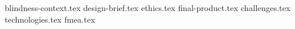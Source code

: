 {blindness-context.tex}
{design-brief.tex}
{ethics.tex}
{final-product.tex}
{challenges.tex}
{technologies.tex}
{fmea.tex}